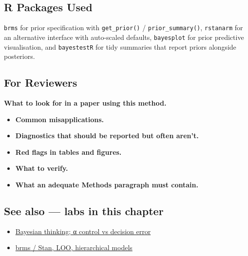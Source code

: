 \documentclass[
]{article}
\providecommand{\tightlist}{%
  \setlength{\itemsep}{0pt}\setlength{\parskip}{0pt}}
\begin{document}
\subsection{R Packages Used}\label{r-packages-used}

\texttt{brms} for prior specification with \texttt{get\_prior()} /
\texttt{prior\_summary()}, \texttt{rstanarm} for an alternative
interface with auto-scaled defaults, \texttt{bayesplot} for prior
predictive visualisation, and \texttt{bayestestR} for tidy summaries
that report priors alongside posteriors.

\subsection{For Reviewers}\label{for-reviewers}

\textbf{What to look for in a paper using this method.}

\begin{itemize}
\tightlist
\item
  \textbf{Common misapplications.}
\item
  \textbf{Diagnostics that should be reported but often aren't.}
\item
  \textbf{Red flags in tables and figures.}
\item
  \textbf{What to verify.}
\item
  \textbf{What an adequate Methods paragraph must contain.}
\end{itemize}

\subsection{See also --- labs in this
chapter}\label{see-also-labs-in-this-chapter}

\begin{itemize}
\tightlist
\item
  \href{labs/lab-bayesian-thinking-control-vs-decision-error.Rmd}{Bayesian
  thinking; α control vs decision error}
\item
  \href{labs/lab-brms-stan-loo-hierarchical-models.Rmd}{brms / Stan,
  LOO, hierarchical models}
\end{itemize}
\end{document}
